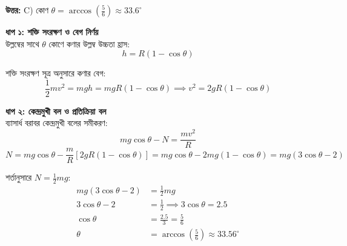 \documentclass[12pt, a4paper]{article}
\begin{document}
\vspace{0.5em}
\begin{tcolorbox}[answerbox]
    \textbf{\color{success} উত্তর:} C) কোণ $\theta = \arccos\left(\frac{5}{6}\right) \approx 33.6^\circ$
\end{tcolorbox}
\vspace{1em}

\begin{tcolorbox}[solutionbox={সমাধান (Solution)}]
    \noindent
    \textbf{ধাপ ১: শক্তি সংরক্ষণ ও বেগ নির্ণয়} \\
    উল্লম্বের সাথে $\theta$ কোণে কণার উল্লম্ব উচ্চতা হ্রাস:
    \[ h = R (1 - \cos\theta) \]
    
    শক্তি সংরক্ষণ সূত্র অনুসারে কণার বেগ:
    \[ \frac{1}{2} m v^2 = m g h = m g R (1 - \cos\theta) \implies v^2 = 2 g R (1 - \cos\theta) \]
    
    \vspace{0.5em}
    \noindent\textbf{ধাপ ২: কেন্দ্রমুখী বল ও প্রতিক্রিয়া বল} \\
    ব্যাসার্ধ বরাবর কেন্দ্রমুখী বলের সমীকরণ:
    \[ m g \cos\theta - N = \frac{m v^2}{R} \]
    \[ N = m g \cos\theta - \frac{m}{R} [2 g R (1 - \cos\theta)] = m g \cos\theta - 2 m g (1 - \cos\theta) = m g (3\cos\theta - 2) \]
    
    শর্তানুসারে $N = \frac{1}{2} m g$:
    \begin{align*}
        m g (3\cos\theta - 2) &= \frac{1}{2} m g \\
        3\cos\theta - 2 &= \frac{1}{2} \implies 3\cos\theta = 2.5 \\
        \cos\theta &= \frac{2.5}{3} = \frac{5}{6} \\
        \theta &= \arccos\left(\frac{5}{6}\right) \approx \mathbf{33.56^\circ}
    \end{align*}
\end{tcolorbox}

\newpage



\newpage
\end{document}
